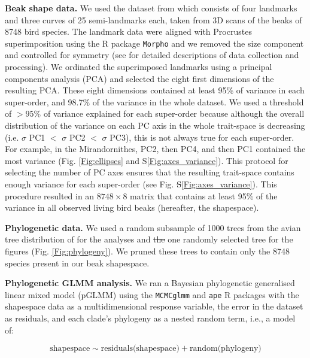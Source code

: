 \documentclass[12pt,letterpaper]{article}
\providecommand{\DIFdeltex}[1]{{\protect\color{red}\sout{#1}}}                      %
\providecommand{\DIFdelbegin}{} %
\providecommand{\DIFdelend}{} %
\providecommand{\DIFdel}[1]{\texorpdfstring{\DIFdeltex{#1}}{}} %
\newcommand{\DIFscaledelfig}{0.5}
\newlength{\DIFdelgraphicswidth} %
\newlength{\DIFdelgraphicsheight} %
\newcommand{\DIFdelincludegraphics}[2][]{%
\sbox{\DIFdelgraphicsbox}{\DIFOincludegraphics[#1]{#2}}%
\settoboxwidth{\DIFdelgraphicswidth}{\DIFdelgraphicsbox} %
\settoboxtotalheight{\DIFdelgraphicsheight}{\DIFdelgraphicsbox} %
\scalebox{\DIFscaledelfig}{%
\parbox[b]{\DIFdelgraphicswidth}{\usebox{\DIFdelgraphicsbox}\\[-\baselineskip] \rule{\DIFdelgraphicswidth}{0em}}\llap{\resizebox{\DIFdelgraphicswidth}{\DIFdelgraphicsheight}{%
\setlength{\unitlength}{\DIFdelgraphicswidth}%
\begin{picture}(1,1)%
\thicklines\linethickness{2pt} %
{\color[rgb]{1,0,0}\put(0,0){\framebox(1,1){}}}%
{\color[rgb]{1,0,0}\put(0,0){\line( 1,1){1}}}%
{\color[rgb]{1,0,0}\put(0,1){\line(1,-1){1}}}%
\end{picture}%
}\hspace*{3pt}}} %
} %
\DeclareRobustCommand{\DIFdelbegin}{\DIFOdelbegin \let\includegraphics\DIFdelincludegraphics} %
\DeclareRobustCommand{\DIFdelend}{\DIFOaddend \let\includegraphics\DIFOincludegraphics} %
\begin{document}
\textbf{Beak shape data.} We used the dataset from \cite{cooney2017mega,hughes2022global,chira2020signature} which consists of four landmarks and three curves of 25 semi-landmarks each, taken from 3D scans of the beaks of 8748 bird species.
The landmark data were aligned with Procrustes superimposition using the R package \texttt{Morpho} \cite{Rcore,Morpho} and we removed the size component and controlled for symmetry (see \cite{cooney2017mega,hughes2022global,chira2020signature} for detailed descriptions of data collection and processing).
We ordinated the superimposed landmarks using a principal components analysis (PCA) and selected the eight first dimensions of the resulting PCA.
These eight dimensions contained at least 95\% of variance in each super-order, and 98.7\% of the variance in the whole dataset.
We used a threshold of $>95$\% of variance explained for each super-order because although the overall distribution of the variance on each PC axis in the whole trait-space is decreasing (i.e. $\sigma$ PC1 $<$ $\sigma$ PC2 $<$ $\sigma$ PC3), this is not always true for each super-order.
For example, in the Mirandornithes, PC2, then PC4, and then PC1 contained the most variance (Fig.
\ref{Fig:ellipses} and S\ref{Fig:axes_variance}).
This protocol for selecting the number of PC axes ensures that the resulting trait-space contains enough variance for each super-order (see Fig. \DIFdelbegin \DIFdel{S}\DIFdelend \ref{Fig:axes_variance}).
This procedure resulted in an $8748 \times 8$ matrix that contains at least 95\% of the variance in all observed living bird beaks (hereafter, the shapespace). %

\textbf{Phylogenetic data.} We used a random subsample of 1000 trees from the avian tree distribution of \cite{jetz2012global} for the analyses and \DIFdelbegin \DIFdel{the }\DIFdelend one randomly selected tree for the figures (Fig. \ref{Fig:phylogeny}).
We pruned these trees to contain only the 8748 species present in our beak shapespace.

\textbf{Phylogenetic GLMM analysis.} We ran a Bayesian phylogenetic generalised linear mixed model (pGLMM) using the \texttt{MCMCglmm} and \texttt{ape} R packages \cite{MCMCglmm, ape} with the shapespace data as a multidimensional response variable, the error in the dataset as residuals, and each clade's phylogeny as a nested random term, i.e., a model of:

\begin{equation}
\text{shapespace} \mathtt{\sim} \text{residuals(shapespace)} + \text{random(phylogeny)}
\end{equation}
\end{document}
